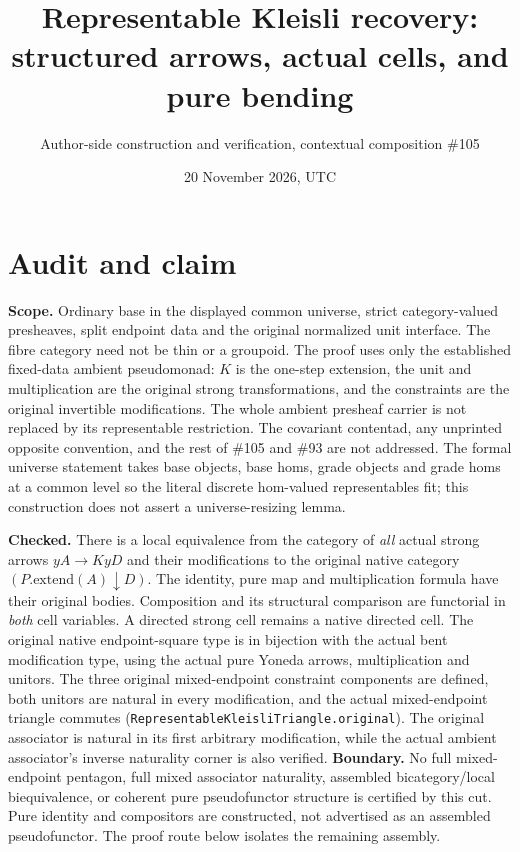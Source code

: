 \documentclass[11pt]{article}
\title{Representable Kleisli recovery: structured arrows, actual cells, and pure bending}
\author{Author-side construction and verification, contextual composition \#105}
\date{20 November 2026, UTC}
\newcommand{\code}[1]{\nolinkurl{#1}}
\begin{document}
\maketitle
\section*{Audit and claim}
\textbf{Scope.} Ordinary base in the displayed common universe, strict category-valued presheaves, split endpoint data and the original normalized unit interface. The fibre category need not be thin or a groupoid. The proof uses only the established fixed-data ambient pseudomonad: $K$ is the one-step extension, the unit and multiplication are the original strong transformations, and the constraints are the original invertible modifications. The whole ambient presheaf carrier is not replaced by its representable restriction. The covariant contentad, any unprinted opposite convention, and the rest of \#105 and \#93 are not addressed. The formal universe statement takes base objects, base homs, grade objects and grade homs at a common level so the literal discrete hom-valued representables fit; this construction does not assert a universe-resizing lemma.

\textbf{Checked.} There is a local equivalence from the category of \emph{all} actual strong arrows $yA\to K yD$ and their modifications to the original native category $(P.\mathrm{extend}(A)\downarrow D)$. The identity, pure map and multiplication formula have their original bodies. Composition and its structural comparison are functorial in \emph{both} cell variables. A directed strong cell remains a native directed cell. The original native endpoint-square type is in bijection with the actual bent modification type, using the actual pure Yoneda arrows, multiplication and unitors. The three original mixed-endpoint constraint components are defined, both unitors are natural in every modification, and the actual mixed-endpoint triangle commutes (\code{RepresentableKleisliTriangle.original}). The original associator is natural in its first arbitrary modification, while the actual ambient associator's inverse naturality corner is also verified. \textbf{Boundary.} No full mixed-endpoint pentagon, full mixed associator naturality, assembled bicategory/local biequivalence, or coherent pure pseudofunctor structure is certified by this cut. Pure identity and compositors are constructed, not advertised as an assembled pseudofunctor. The proof route below isolates the remaining assembly.
\end{document}
